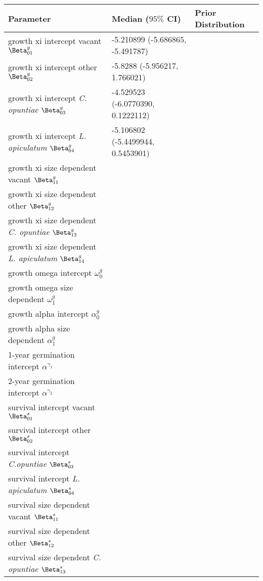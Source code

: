 \documentclass[11pt]{article}\usepackage[sc]{mathpazo} %
\begin{document}
  \begin{table}[]
  \begin{tabular}{l|l|l}
    \textbf{Parameter} & \textbf{Median ($95\%$ CI)} & \textbf{Prior Distribution} \\
    \hline
    growth xi intercept vacant $\Beta_{01}^g$ & -5.210899 (-5.686865, -5.491787) & \\
    growth xi intercept other $\Beta_{02}^g$ & -5.8288 (-5.956217, 1.766021) & \\
    growth xi intercept \textit{C. opuntiae} $\Beta_{03}^g$ & -4.529523 (-6.0770390, 0.1222112) & \\
    growth xi intercept \textit{L. apiculatum} $\Beta_{04}^g$ & -5.106802 (-5.4499944, 0.5453901) & \\
    growth xi size dependent vacant $\Beta_{11}^g$ & & \\
    growth xi size dependent other $\Beta_{12}^g$ & & \\
    growth xi size dependent \textit{C. opuntiae} $\Beta_{13}^g$ & & \\
    growth xi size dependent \textit{L. apiculatum} $\Beta_{14}^g$ & & \\
    growth omega intercept $\omega_0^g$ & & \\
    growth omega size dependent $\omega_1^g$ & & \\
    growth alpha intercept $\alpha_0^g$ & & \\
    growth alpha size dependent $\alpha_1^g$ & & \\
    \hline
    1-year germination intercept $\alpha^{\gamma_1}$ & & \\
    2-year germination intercept $\alpha^{\gamma_2}$ & & \\
    \hline
    survival intercept vacant $\Beta_{01}^s$ & & \\
    survival intercept other $\Beta_{02}^s$ & & \\
    survival intercept \textit{C.opuntiae} $\Beta_{03}^s$ & & \\
    survival intercept \textit{L. apiculatum} $\Beta_{04}^s$ & & \\
    survival size dependent vacant $\Beta_{11}^s$ & & \\
    survival size dependent other $\Beta_{12}^s$ & & \\
    survival size dependent \textit{C. opuntiae} $\Beta_{13}^s$ & & \\

\end{tabular}
\end{table}
\end{document}
